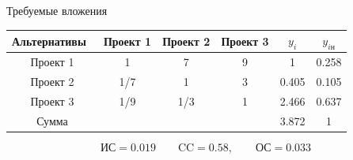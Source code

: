 \documentclass[unicode,11pt,notheorems,xcolor=table]{beamer}
\begin{document}
\begin{frame}{Требуемые вложения}
    \begin{tabular}{c|ccc|cc}
    \hline
        Альтернативы & Проект 1 & Проект 2 & Проект 3 & $y_i$ & $y_{i\text{н}}$\\
    \hline
        Проект 1 & 1 & 7 & 9 & 1 & 0.258\\
        Проект 2 & 1/7 & 1  & 3 & 0.405 & 0.105\\
        Проект 3 & 1/9 & 1/3  & 1 & 2.466 & 0.637\\
    \hline
        Сумма & & & & 3.872 & 1\\
    \hline
    \end{tabular}
    $$
    \text{ИС}=0.019\qquad \text{CC}= 0.58,\qquad \text{ОС}=0.033
    $$
\end{frame}
\end{document}
